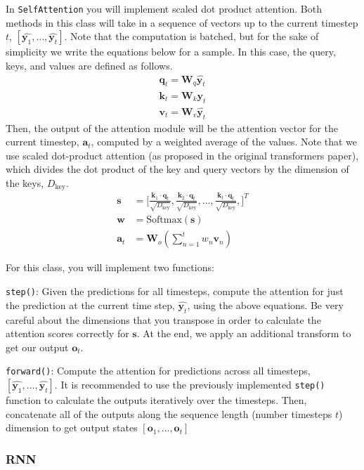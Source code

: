 \documentclass[11pt,addpoints,answers]{exam}
\newcommand{\av}{\mathbf{a}}
\newcommand{\kv}{\mathbf{k}}
\newcommand{\ov}{\mathbf{o}}
\newcommand{\qv}{\mathbf{q}}
\newcommand{\sv}{\mathbf{s}}
\newcommand{\vv}{\mathbf{v}}
\newcommand{\wv}{\mathbf{w}}
\newcommand{\yv}{\mathbf{y}}
\newcommand{\Wv}{\mathbf{W}}
\begin{document}
In \lstinline{SelfAttention} you will implement scaled dot product attention. Both methods in this class will take in a sequence of vectors up to the current timestep $t$, $[\hat{\yv_1}, \ldots, \hat{\yv_t}]$. Note that the computation is batched, but for the sake of simplicity we write the equations below for a sample. In this case, the query, keys, and values are defined as follows.
\begin{align*}
\qv_t = \Wv_q \hat{\yv_t} \\
\kv_t = \Wv_k \hat{\yv_t}\\
\vv_t = \Wv_v \hat{\yv_t}
\end{align*}
Then, the output of the attention module will be the attention vector for the current timestep, $\av_t$, computed by a weighted average of the values. Note that we use scaled dot-product attention (as proposed in the original transformers paper), which divides the dot product of the key and query vectors by the dimension of the keys, $D_\text{key}$.
\begin{align*}
    \sv &= \bigg[ \frac{\kv_1 \cdot \qv_t}{\sqrt{D_\text{key}}}, \frac{\kv_2 \cdot \qv_t}{\sqrt{D_\text{key}}}, \ldots, \frac{\kv_t \cdot \qv_t}{\sqrt{D_\text{key}}}, \bigg]^T \tag{Attention Scores} \\
    \wv &= \text{Softmax}(\sv) \tag{Attention Weights} \\
    \av_t &= \Wv_o \left(\sum_{n=1}^t w_n \vv_n\right)
\end{align*}

For this class, you will implement two functions:

\texttt{step()}: Given the predictions for all timesteps, compute the attention for just the prediction at the current time step, $\hat{\yv_t}$, using the above equations. Be very careful about the dimensions that you transpose in order to calculate the attention scores correctly for $\sv$. At the end, we apply an additional transform to get our output $\ov_t$.

\texttt{forward()}: Compute the attention for predictions across all timesteps, $[\hat{\yv_1}, \ldots, \hat{\yv_t}]$. It is recommended to use the previously implemented \texttt{step()} function to calculate the outputs iteratively over the timesteps. Then, concatenate all of the outputs along the sequence length (number timesteps $t$) dimension to get output states $[\ov_1, \ldots, \ov_t]$

\subsubsection{RNN}
\end{document}
